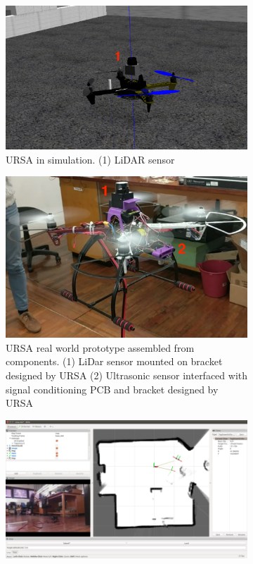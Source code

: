 \documentclass[capstone_report.tex]{subfiles}
\begin{document}
\begin{figure}[H]
    \centering
    \begin{subfigure}[t]{0.49\textwidth}
        \centering
        \includegraphics[width=\textwidth]{imgs/simulation_labelled.png}
        \caption{URSA in simulation. (1) LiDAR sensor}
        \label{fig:sim}
    \end{subfigure}
    \hfill
    \begin{subfigure}[t]{0.49\textwidth}
        \centering
        \includegraphics[width=\textwidth]{imgs/real_labelled.png}
        \caption{URSA real world prototype assembled from components. (1) LiDar sensor mounted on bracket designed by URSA (2) Ultrasonic sensor interfaced with signal conditioning PCB and bracket designed by URSA}
        \label{fig:real}
    \end{subfigure}
    \begin{subfigure}[t]{0.49\textwidth}
        \centering
        \includegraphics[width=\textwidth]{imgs/mapping/map_80cm.png}

\end{subfigure}
\end{figure}
\end{document}
